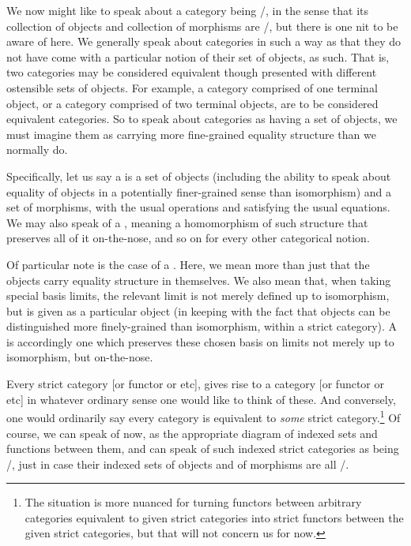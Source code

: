 We now might like to speak about a category being \repsmall/, in the sense that its collection of objects and collection of morphisms are \repsmall/, but there is one nit to be aware of here. We generally speak about categories in such a way as that they do not have come with a particular notion of their set of objects, as such. That is, two categories may be considered equivalent though presented with different ostensible sets of objects. For example, a category comprised of one terminal object, or a category comprised of two terminal objects, are to be considered equivalent categories. So to speak about categories as having a set of objects, we must imagine them as carrying more fine-grained equality structure than we normally do.

Specifically, let us say a  is a set of objects (including the ability to speak about equality of objects in a potentially finer-grained sense than isomorphism) and a set of morphisms, with the usual operations and satisfying the usual equations.  We may also speak of a , meaning a homomorphism of such structure that preserves all of it on-the-nose, and so on for every other categorical notion.

Of particular note is the case of a . Here, we mean more than just that the objects carry equality structure in themselves. We also mean that, when taking special basis limits, the relevant limit is not merely defined up to isomorphism, but is given as a particular object (in keeping with the fact that objects can be distinguished more finely-grained than isomorphism, within a strict category). A  is accordingly one which preserves these chosen basis on limits not merely up to isomorphism, but on-the-nose. 

Every strict category [or functor or etc], gives rise to a category [or functor or etc] in whatever ordinary sense one would like to think of these. And conversely, one would ordinarily say every category is equivalent to \emph{some} strict category.\footnote{The situation is more nuanced for turning functors between arbitrary categories equivalent to given strict categories into strict functors between the given strict categories, but that will not concern us for now.} Of course, we can speak of  now, as the appropriate diagram of indexed sets and functions between them, and can speak of such indexed strict categories as being \repsmall/, just in case their indexed sets of objects and of morphisms are all \repsmall/.


